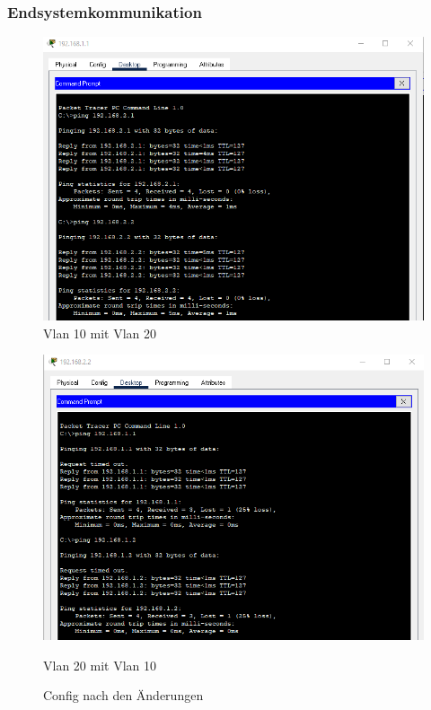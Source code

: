 \subsubsection{Endsystemkommunikation}
\begin{figure}[!htb]
    \centering
    \includegraphics[width=\textwidth,height=.49\textwidth,keepaspectratio]{./img/test2.png}
    \caption{Vlan 10 mit Vlan 20}
\end{figure}
\begin{figure}[!htb]
    \centering
    \includegraphics[width=\textwidth,height=.49\textwidth,keepaspectratio]{./img/test1.png}
    \caption{Vlan 20 mit Vlan 10}
    \caption{Config nach den Änderungen}
\end{figure}
\FloatBarrier
